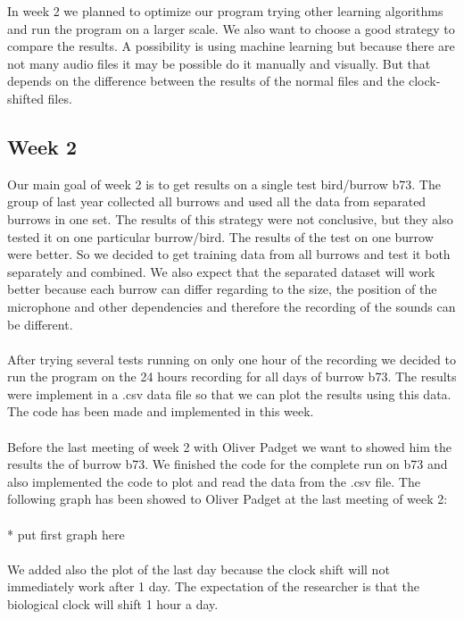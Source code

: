 \documentclass[a4paper]{article}
\begin{document}
In week 2 we planned to optimize our program trying other learning algorithms and run the program on a larger scale. We also want to choose a good strategy to compare the results. A possibility is using machine learning but because there are not many audio files it may be possible do it manually and visually. But that depends on the difference between the results of the normal files and the clock-shifted files. 

\subsection*{Week 2}

Our main goal of week 2 is to get results on a single test bird/burrow b73. The group of last year collected all burrows and used all the data from separated burrows in one set.  The results of this strategy were not conclusive, but they also tested it on one particular burrow/bird. The results of the test on one burrow were better. So we decided to get training data from all burrows and test it both separately and combined. We also expect that the separated dataset will work better because each burrow can differ regarding to the size, the position of the microphone and other dependencies and therefore the recording of the sounds can be different.\\\\
After trying several tests running on only one hour of the recording we decided to run the program on the 24 hours recording for all days of burrow b73. The results were implement in a .csv data file so that we can plot the results using this data. The code has been made and implemented in this week. \\\\
Before the last meeting of week 2 with Oliver Padget we want to showed him the results the of burrow b73. We finished the code for the complete run on b73 and also implemented the code to plot and read the data from the .csv file. The following graph has been showed  to Oliver Padget at the last meeting of week 2:\\\\
* put first graph here\\\\
We added also the plot of the last day because the clock shift will not immediately work after 1 day. The expectation of the researcher is that the biological clock will shift 1 hour a day. \\\\
\end{document}
